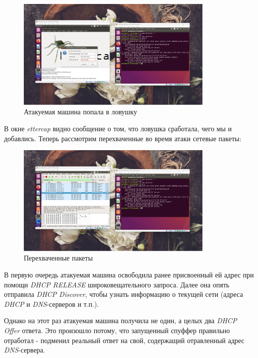 \documentclass[a4paper]{article}
\begin{document}
  \begin{figure}[H]
    \centering
    \includegraphics[width=0.85\textwidth]{02_00 (28)}
    \caption{Атакуемая машина попала в ловушку}
    \label{img:0025}
  \end{figure}

  В окне \textit{ettercap} видно сообщение о том, что ловушка сработала, чего мы и добавлись.
  Теперь рассмотрим перехваченные во время атаки сетевые пакеты:

  \begin{figure}[H]
    \centering
    \includegraphics[width=0.85\textwidth]{02_00 (32)}
    \caption{Перехваченные пакеты}
    \label{img:0026}
  \end{figure}

  В первую очередь атакуемая машина освободила ранее присвоенный ей адрес при помощи
  \textit{DHCP RELEASE} широковещательного запроса. Далее она опять отправила \textit{DHCP Discover},
  чтобы узнать информацию о текущей сети (адреса \textit{DHCP} и \textit{DNS}-серверов и т.п.).

  Однако на этот раз атакуемая машина получила не один, а целых два \textit{DHCP Offer} ответа.
  Это произошло потому, что запущенный спуффер правильно отработал - подменил реальный ответ на свой,
  содержащий отравленный адрес \textit{DNS}-сервера.
\end{document}
